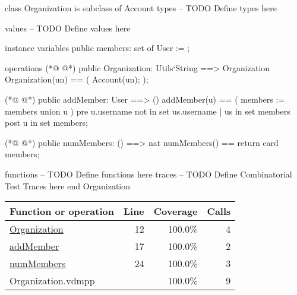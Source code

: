 \begin{vdmpp}[breaklines=true]
class Organization is subclass of Account
types
-- TODO Define types here

values
-- TODO Define values here

instance variables
 public members: set of User := {};

operations
(*@
\label{Organization:12}
@*)
 public Organization: Utils`String ==> Organization
 Organization(un) == (
  Account(un);
 );
 
(*@
\label{addMember:17}
@*)
 public addMember: User ==> ()
 addMember(u) == (
  members := members union {u}
 )
 pre u.username not in set {us.username | us in set members}
 post u in set members;
 
(*@
\label{numMembers:24}
@*)
 public numMembers: () ==> nat
 numMembers() == return card members;
 
functions
-- TODO Define functions here
traces
-- TODO Define Combinatorial Test Traces here
end Organization
\end{vdmpp}
\bigskip
\begin{longtable}{|l|r|r|r|}
\hline
Function or operation & Line & Coverage & Calls \\
\hline
\hline
\hyperref[Organization:12]{Organization} & 12&100.0\% & 4 \\
\hline
\hyperref[addMember:17]{addMember} & 17&100.0\% & 2 \\
\hline
\hyperref[numMembers:24]{numMembers} & 24&100.0\% & 3 \\
\hline
\hline
Organization.vdmpp & & 100.0\% & 9 \\
\hline
\end{longtable}

